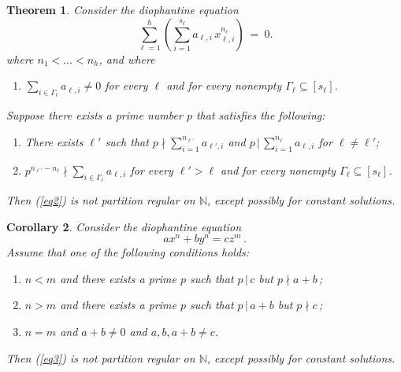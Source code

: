 \documentclass[11pt]{amsart}
\newtheorem{theorem}{Theorem}[section]
\newtheorem{corollary}[theorem]{Corollary}
\theoremstyle{definition}
\theoremstyle{remark}
\numberwithin{equation}{section}
\begin{document}
\begin{theorem}\label{main2}
Consider the diophantine equation
\begin{equation}\label{eq2}
\sum_{\ell=1}^h 
\left(\sum_{i=1}^{s_\ell}a_{\ell,i}\,x_{\ell,i}^{n_\ell}\right)\ =\ 0.
\end{equation}
where $n_1<\ldots<n_h$, and where

\smallskip
\begin{enumerate}
\item
$\sum_{i\in\Gamma_\ell}a_{\ell,i}\ne 0$ for every $\ell$
and for every nonempty 
$\Gamma_\ell\subseteq[s_\ell]$.
\end{enumerate}

\smallskip
\noindent
Suppose there exists a prime number $p$ that satisfies
the following:

\smallskip
\begin{enumerate}
\item[(2)]
There exists $\ell'$ such that
$p{\nmid}\sum_{i=1}^{n_{\ell'}}a_{\ell'\!,i}$ and
$p{\,|\,}\sum_{i=1}^{n_\ell}a_{\ell,i}$ for $\ell\ne\ell'$;

\smallskip
\item[(3)]
$p^{n_{\ell'}-n_\ell}{\nmid}\sum_{i\in\Gamma_\ell}a_{\ell,i}$
for every $\ell'>\ell$ and for every nonempty 
$\Gamma_\ell\subseteq[s_\ell]$.
\end{enumerate}

\smallskip
Then (\ref{eq2}) is not partition regular on ${\mathbb{N}}$,
except possibly for constant solutions.
\end{theorem}

\begin{corollary}\label{cor1}
Consider the diophantine equation
\begin{equation}\label{eq3}
a x^n+b y^n=c z^m\,.
\end{equation}
Assume that one of the following conditions holds:

\smallskip
\begin{enumerate}
\item[(i)]
$n<m$ and there exists a prime $p$
such that $p{\,|\,} c$ but $p{\nmid} a+b$\,;

\smallskip
\item[(ii)]
$n>m$ and there exists a prime $p$
such that $p{\,|\,} a+b$ but $p{\nmid} c$\,;

\smallskip
\item[(iii)]
$n=m$ and $a+b\ne 0$ and $a,b,a+b\ne c$.
\end{enumerate}

\smallskip
Then
(\ref{eq3})
is not partition regular on ${\mathbb{N}}$,
except possibly for constant solutions.
\end{corollary}
\end{document}
